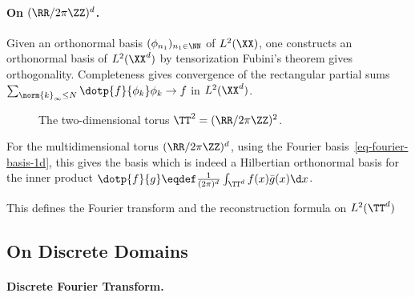    
\paragraph{On \texorpdfstring{$(\RR/2\pi\ZZ)^d$}{the Torus}.}

Given an orthonormal basis $(\phi_{n_1})_{n_1 \in \NN}$ of $L^2(\XX)$, one constructs an orthonormal basis of $L^2(\XX^d)$ by tensorization
Fubini's theorem gives orthogonality. Completeness gives convergence of the rectangular partial sums $\sum_{\norm{k}_\infty \leq N} \dotp{f}{\phi_k} \phi_k \rightarrow f$ in $L^2(\XX^d)$.

           
\begin{figure}[tbp]
\centering
{}
\caption{The two-dimensional torus $\TT^2=(\RR/2\pi\ZZ)^2$.}
\label{fig-review-fourier-torus}
\end{figure}
   
For the multidimensional torus $(\RR/2\pi\ZZ)^d$, using the Fourier basis~\eqref{eq-fourier-basis-1d}, this gives the basis
which is indeed a Hilbertian orthonormal basis for the inner product $\dotp{f}{g} \eqdef \frac{1}{(2\pi)^d} \int_{\TT^d} f(x)\bar g(x)\d x$. 
 
This defines the Fourier transform and the reconstruction formula on $L^2(\TT^d)$

                                                
\subsection{On Discrete Domains}
\label{sec-fft-2d}

    
\paragraph{Discrete Fourier Transform.}


